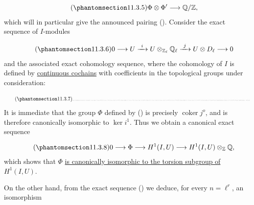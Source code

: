 \begin{equation}\tag{\SGARefTarget{sga7.sga7i.eix.n11-3-5}{11.3.5}}
\Phi\otimes\Phi'\longrightarrow\mathbb Q/\mathbb Z,
\end{equation}
which will in particular give the announced pairing (). Consider
the exact sequence of $I$-modules

\begin{equation}\tag{\SGARefTarget{sga7.sga7i.eix.n11-3-6}{11.3.6}}
0\longrightarrow U\xrightarrow{\ i\ }
 U\otimes_{\mathbb Z_\ell}\mathbb Q_\ell
 \xrightarrow{\ j\ }U\otimes D_\ell\longrightarrow0
\end{equation}
and the associated exact cohomology sequence, where the cohomology of
$I$ is defined by \underline{continuous cochains} with coefficients in
the topological groups under consideration:

\begin{equation}\tag{\SGARefTarget{sga7.sga7i.eix.n11-3-7}{11.3.7}}
\resizebox{\textwidth}{!}{%
\begin{tikzcd}[ampersand replacement=\&, column sep=small, row sep=large]
0 \arrow[r]
 \& H^o(I,U) \arrow[r, "i^o"] \arrow[d, no head, "\wr"]
 \& H^o(I,U\otimes\mathbb Q_\ell) \arrow[r, "j^o"]
      \arrow[d, no head, "\wr"]
 \& H^o(I,U\otimes D_\ell) \arrow[r, "\partial"]
      \arrow[d, no head, "\wr"]
 \& H^1(I,U) \arrow[r, "i^1"]
 \& H^1(I,U\otimes\mathbb Q_\ell) \arrow[d, no head, "\wr"] \\
{}
 \& U^I
 \& (U\otimes\mathbb Q_\ell)^I\simeq U^I\otimes_{\mathbb Z}\mathbb Q
 \& (U\otimes D_\ell)^I
 \& {}
 \& H^1(I,U)\otimes_{\mathbb Z}\mathbb Q .
\end{tikzcd}}
\end{equation}
It is immediate that the group $\Phi$ defined by () is precisely
$\operatorname{coker}j^o$, and is therefore canonically isomorphic to
$\ker i^1$. Thus we obtain a canonical exact sequence

\begin{equation}\tag{\SGARefTarget{sga7.sga7i.eix.n11-3-8}{11.3.8}}
0\longrightarrow\Phi\longrightarrow H^1(I,U)
 \longrightarrow H^1(I,U)\otimes_{\mathbb Z}\mathbb Q,
\end{equation}
which shows that $\Phi$ \underline{is canonically isomorphic to the
torsion subgroup of $H^1(I,U)$}.

On the other hand, from the exact sequence () we deduce, for every
$n=\ell^r$, an isomorphism

